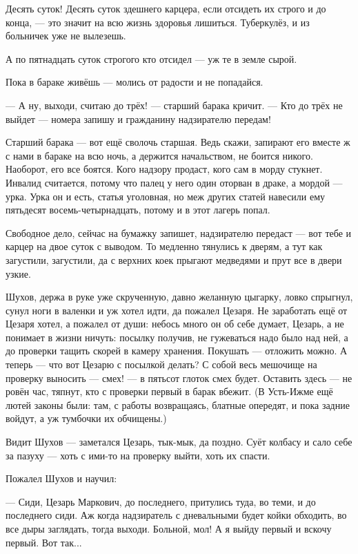 Десять суток! Десять суток здешнего карцера, если отсидеть их строго и до конца, --- это значит
на всю жизнь здоровья лишиться. Туберкулёз, и из больничек уже не вылезешь.

А по пятнадцать суток строгого кто отсидел --- уж те в земле сырой.

Пока в бараке живёшь --- молись от радости и не попадайся.

--- А ну, выходи, считаю до трёх! --- старший барака кричит. --- Кто до трёх не выйдет --- номера
запишу и гражданину надзирателю передам!

Старший барака --- вот ещё сволочь старшая. Ведь скажи, запирают его вместе ж с нами в бараке
на всю ночь, а держится начальством, не боится никого. Наоборот, его все боятся. Кого надзору
продаст, кого сам в морду стукнет. Инвалид считается, потому что палец у него один оторван в
драке, а мордой --- урка. Урка он и есть, статья уголовная, но меж других статей навесили ему
пятьдесят восемь-четырнадцать, потому и в этот лагерь попал.

Свободное дело, сейчас на бумажку запишет, надзирателю передаст --- вот тебе и карцер на двое
суток с выводом. То медленно тянулись к дверям, а тут как загустили, загустили, да с верхних
коек прыгают медведями и прут все в двери узкие.

Шухов, держа в руке уже скрученную, давно желанную цыгарку, ловко спрыгнул, сунул ноги в
валенки и уж хотел идти, да пожалел Цезаря. Не заработать ещё от Цезаря хотел, а пожалел от
души: небось много он об себе думает, Цезарь, а не понимает в жизни ничуть: посылку получив, не
гужеваться надо было над ней, а до проверки тащить скорей в камеру хранения. Покушать ---
отложить можно. А теперь --- что вот Цезарю с посылкой делать? С собой весь мешочище на
проверку выносить --- смех! --- в пятьсот глоток смех будет. Оставить здесь --- не ровён час,
тяпнут, кто с проверки первый в барак вбежит. (В Усть-Ижме ещё лютей законы были: там, с работы
возвращаясь, блатные опередят, и пока задние войдут, а уж тумбочки их обчищены.)

Видит Шухов --- заметался Цезарь, тык-мык, да поздно. Суёт колбасу и сало себе за пазуху --- хоть
с ими-то на проверку выйти, хоть их спасти.

Пожалел Шухов и научил:

--- Сиди, Цезарь Маркович, до последнего, притулись туда, во теми, и до последнего сиди. Аж
когда надзиратель с дневальными будет койки обходить, во все дыры заглядать, тогда выходи.
Больной, мол! А я выйду первый и вскочу первый. Вот так...

